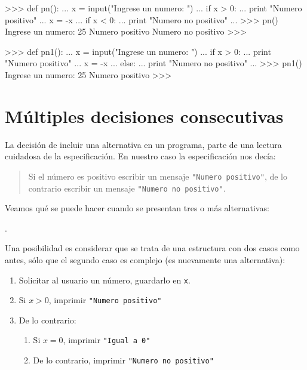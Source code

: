 \noindent
\begin{minipage}[t]{80mm}
\footnotesize
\begin{codigo-python-sn}
>>> def pn():
...     x = input("Ingrese un numero: ")
...     if x > 0:
...        print "Numero positivo"
...        x = -x
...     if x < 0:
...        print "Numero no positivo"
...
>>> pn()
Ingrese un numero: 25
Numero positivo
Numero no positivo
>>>
\end{codigo-python-sn}
\end{minipage}
\begin{minipage}[t]{80mm}
\footnotesize
\begin{codigo-python-sn}
>>> def pn1():
...     x = input("Ingrese un numero: ")
...     if x > 0:
...        print "Numero positivo"
...        x = -x
...     else:
...        print "Numero no positivo"
...
>>> pn1()
Ingrese un numero: 25
Numero positivo
>>>
\end{codigo-python-sn}
\end{minipage}
\normalsize

\section{Múltiples decisiones consecutivas}

La decisión de incluir una alternativa en un programa, parte de una
lectura cuidadosa de la especificación. En nuestro caso la especificación
nos decía:
\begin{quote}
Si el número es positivo escribir un mensaje
\lstinline!"Numero positivo"!, de lo contrario escribir un mensaje
\lstinline!"Numero no positivo"!.
\end{quote}

Veamos qué se puede hacer cuando se presentan tres o más alternativas:

.

Una posibilidad es considerar que se trata de una estructura con dos
casos como antes, sólo que el segundo caso es complejo (es nuevamente una alternativa):

\begin{enumerate}
\item Solicitar al usuario un número, guardarlo en \lstinline!x!.
\item Si $x>0$, imprimir \lstinline!"Numero positivo"!
\item De lo contrario:
\begin{enumerate}
\item Si $x=0$, imprimir \lstinline!"Igual a 0"!
\item De lo contrario, imprimir \lstinline!"Numero no positivo"!
\end{enumerate}
\end{enumerate}

